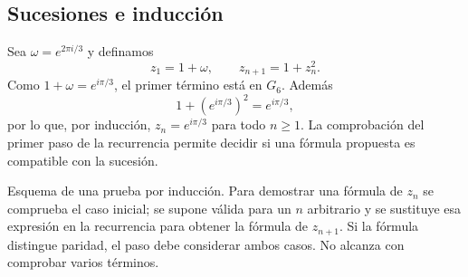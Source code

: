 \subsection{Sucesiones e inducción}
\begin{ejemplo}
Sea $\omega=e^{2\pi i/3}$ y definamos
\[
z_1=1+\omega,\qquad z_{n+1}=1+z_n^2.
\]
Como $1+\omega=e^{i\pi/3}$, el primer término está en $G_6$.
Además
\[
1+(e^{i\pi/3})^2=e^{i\pi/3},
\]
por lo que, por inducción, $z_n=e^{i\pi/3}$ para todo $n\geq1$.
La comprobación del primer paso de la recurrencia permite decidir si
una fórmula propuesta es compatible con la sucesión.
\end{ejemplo}
\begin{nota}{Esquema de una prueba por inducción.}
Para demostrar una fórmula de $z_n$ se comprueba el caso inicial;
se supone válida para un $n$ arbitrario y se sustituye esa expresión
en la recurrencia para obtener la fórmula de $z_{n+1}$.
Si la fórmula distingue paridad, el paso debe considerar ambos casos.
No alcanza con comprobar varios términos.
\end{nota}
